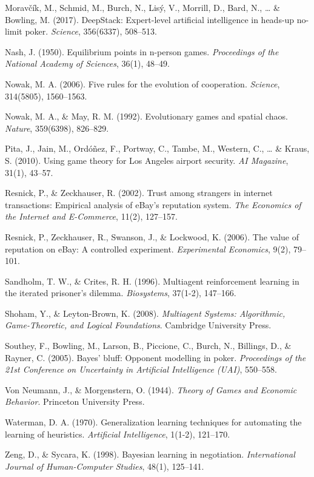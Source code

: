 \documentclass[
]{article}
\begin{document}
Moravčík, M., Schmid, M., Burch, N., Lisý, V., Morrill, D., Bard, N.,
\ldots{} \& Bowling, M. (2017). DeepStack: Expert-level artificial
intelligence in heads-up no-limit poker. \emph{Science}, 356(6337),
508--513.

Nash, J. (1950). Equilibrium points in n-person games. \emph{Proceedings
of the National Academy of Sciences}, 36(1), 48--49.

Nowak, M. A. (2006). Five rules for the evolution of cooperation.
\emph{Science}, 314(5805), 1560--1563.

Nowak, M. A., \& May, R. M. (1992). Evolutionary games and spatial
chaos. \emph{Nature}, 359(6398), 826--829.

Pita, J., Jain, M., Ordóñez, F., Portway, C., Tambe, M., Western, C.,
\ldots{} \& Kraus, S. (2010). Using game theory for Los Angeles airport
security. \emph{AI Magazine}, 31(1), 43--57.

Resnick, P., \& Zeckhauser, R. (2002). Trust among strangers in internet
transactions: Empirical analysis of eBay's reputation system. \emph{The
Economics of the Internet and E-Commerce}, 11(2), 127--157.

Resnick, P., Zeckhauser, R., Swanson, J., \& Lockwood, K. (2006). The
value of reputation on eBay: A controlled experiment. \emph{Experimental
Economics}, 9(2), 79--101.

Sandholm, T. W., \& Crites, R. H. (1996). Multiagent reinforcement
learning in the iterated prisoner's dilemma. \emph{Biosystems}, 37(1-2),
147--166.

Shoham, Y., \& Leyton-Brown, K. (2008). \emph{Multiagent Systems:
Algorithmic, Game-Theoretic, and Logical Foundations}. Cambridge
University Press.

Southey, F., Bowling, M., Larson, B., Piccione, C., Burch, N., Billings,
D., \& Rayner, C. (2005). Bayes' bluff: Opponent modelling in poker.
\emph{Proceedings of the 21st Conference on Uncertainty in Artificial
Intelligence (UAI)}, 550--558.

Von Neumann, J., \& Morgenstern, O. (1944). \emph{Theory of Games and
Economic Behavior}. Princeton University Press.

Waterman, D. A. (1970). Generalization learning techniques for
automating the learning of heuristics. \emph{Artificial Intelligence},
1(1-2), 121--170.

Zeng, D., \& Sycara, K. (1998). Bayesian learning in negotiation.
\emph{International Journal of Human-Computer Studies}, 48(1), 125--141.
\end{document}
